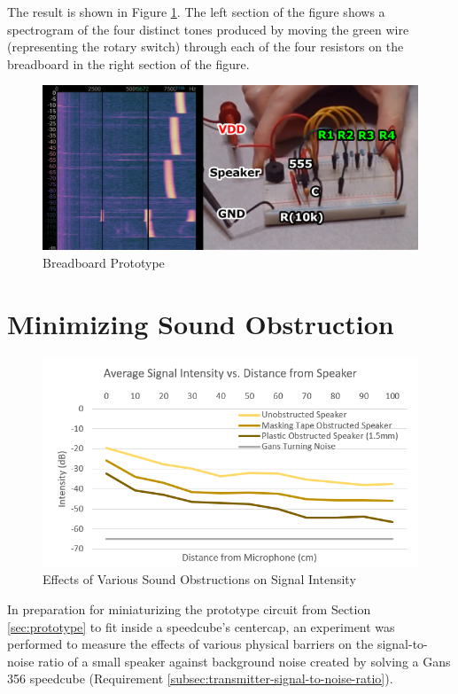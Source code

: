 The result is shown in Figure \ref{fig:breadboard}. The left section of
the figure shows a spectrogram of the four distinct tones produced by
moving the green wire (representing the rotary switch) through each of
the four resistors on the breadboard in the right section of the figure.

\begin{figure}
    \centering
    \caption{Breadboard Prototype}
    \label{fig:breadboard}
    \includegraphics[width=\linewidth]{Figures/6 PCB Design/breadboard_spectrogram.png}
\end{figure}


\section{Minimizing Sound Obstruction}
\label{sec:minimizing-sound-obstruction}

\begin{figure}
    \centering
    \caption{Effects of Various Sound Obstructions on Signal Intensity}
    \label{fig:obstruction}
    \includegraphics[width=\linewidth]{Figures/6 PCB Design/obstruction_intensity.png}
\end{figure}

In preparation for miniaturizing the prototype circuit from Section
\ref{sec:prototype} to fit inside a speedcube's centercap, an
experiment was performed to measure the effects of various physical
barriers on the signal-to-noise ratio of a small speaker against
background noise created by solving a Gans 356 speedcube (Requirement
\ref{subsec:transmitter-signal-to-noise-ratio}).

